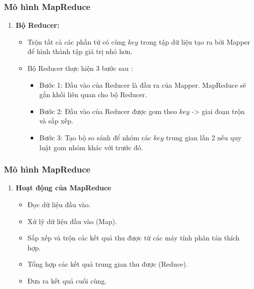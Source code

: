 \documentclass[12pt]{beamer}
\begin{document}
	\begin{frame}
		\frametitle{Mô hình MapReduce}
		\begin{enumerate} [\textbf{3.}]
			\item \textbf{Bộ Reducer:}
			\begin{itemize}
				\item Trộn tất cả các phần tử có cùng $key$ trong tập dữ liệu tạo ra bởi Mapper để hình thành tập giá trị nhỏ hơn.
				\item Bộ Reducer thực hiện 3 bước sau :
				\begin{itemize}
					\item Bước 1: Đầu vào của Reducer là đầu ra của Mapper. MapReduce sẽ gắn khối liên quan cho bộ Reducer.
					\item Bước 2: Đầu vào của Reducer được gom theo $key$ -> giai đoạn trộn và sắp xếp.
					\item Bước 3: Tạo bộ so sánh để nhóm các $key$ trung gian lần 2 nếu quy luật gom nhóm khác với trước đó.
				\end{itemize}
			\end{itemize}
		\end{enumerate}
	\end{frame}

	\begin{frame}
		\frametitle{Mô hình MapReduce}
		\begin{enumerate} [\textbf{4.}]
			\item \textbf{Hoạt động của MapReduce}
				\begin{itemize}
					\item Đọc dữ liệu đầu vào.
					\item Xử lý dữ liệu đầu vào (Map).
					\item Sắp xếp và trộn các kết quả thu được từ các máy tính phân tán thích hợp.
					\item Tổng hợp các kết quả trung gian thu được (Reduce).
					\item Đưa ra kết quả cuối cùng.
				\end{itemize}
		\end{enumerate}
	\end{frame}
	
\end{document}
